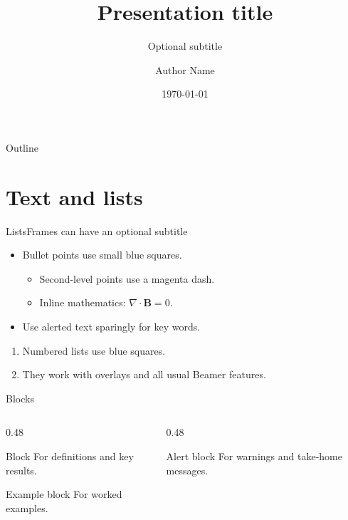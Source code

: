 \documentclass[aspectratio=169, 11pt]{beamer}
\title{Presentation title}
\subtitle{Optional subtitle}
\author[A. Name]{Author Name}
\institute{Affiliation}
\date{\today}
\begin{document}
\fcdttitleframe

\begin{frame}{Outline}
  \tableofcontents
\end{frame}

\section{Text and lists}

\begin{frame}{Lists}{Frames can have an optional subtitle}
  \begin{itemize}
    \item Bullet points use small blue squares.
      \begin{itemize}
        \item Second-level points use a magenta dash.
        \item Inline mathematics: \(\nabla \cdot \mathbf{B} = 0\).
      \end{itemize}
    \item Use \alert{alerted text} sparingly for key words.
  \end{itemize}
  \begin{enumerate}
    \item Numbered lists use blue squares.
    \item They work with overlays and all usual Beamer features.
  \end{enumerate}
\end{frame}

\begin{frame}{Blocks}
  \begin{columns}[T]
    \begin{column}{0.48\textwidth}
      \begin{block}{Block}
        For definitions and key results.
      \end{block}
      \begin{exampleblock}{Example block}
        For worked examples.
      \end{exampleblock}
    \end{column}
    \begin{column}{0.48\textwidth}
      \begin{alertblock}{Alert block}
        For warnings and take-home messages.
      \end{alertblock}
    \end{column}
  \end{columns}
\end{frame}
\end{document}
